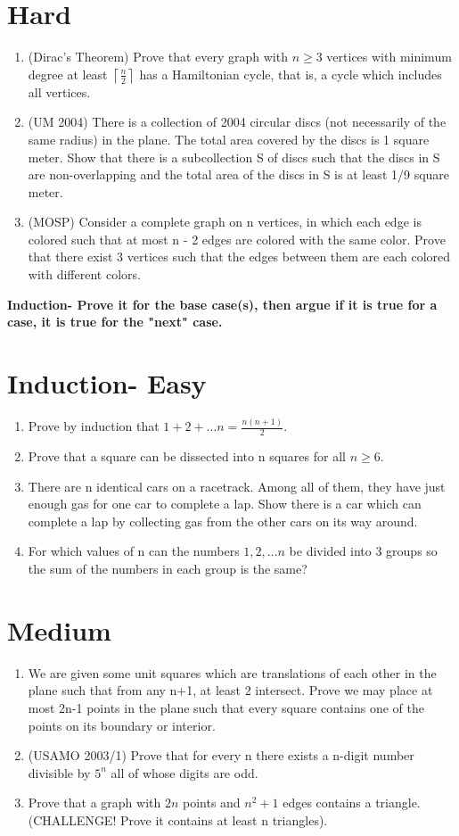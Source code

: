 \documentclass{article}
\begin{document}
\section{Hard}
\begin{enumerate}
\item (Dirac's Theorem) Prove that every graph with $n \geq 3$ vertices with minimum degree at least $\left\lceil \frac{n}{2}\right\rceil$ has a Hamiltonian cycle, that is, a cycle which includes all vertices.
\item (UM 2004) There is a collection of 2004 circular discs (not necessarily of the same
radius) in the plane. The total area covered by the discs is 1 square meter. Show that
there is a subcollection S of discs such that the discs in S are non-overlapping and the
total area of the discs in S is at least 1/9 square meter.
\item (MOSP) Consider a complete graph on n vertices, in which each edge is colored
such that at most n - 2 edges are colored with the same color. Prove
that there exist 3 vertices such that the edges between them are each
colored with different colors.
\end{enumerate}


\textbf{Induction- Prove it for the base case(s), then argue if it is true for a case, it is true for the "next" case.}
\section{Induction- Easy}
\begin{enumerate}
\item Prove by induction that $1+2+\ldots n = \frac{n(n+1)}{2}$.
\item Prove that a square can be dissected into n squares for all $n \geq 6$.
\item There are n identical cars on a racetrack. Among all of them, they have just enough gas for one car to complete a lap. Show there is a car which can complete a lap by collecting gas from the other cars on its way around.
\item For which values of n can the numbers $1,2,\ldots n$ be divided into 3 groups so the sum of the numbers in each group is the same?
\end{enumerate}
\section{Medium}
\begin{enumerate}
\item We are given some unit squares which are translations of each other in the plane such that from any n+1, at least 2 intersect. Prove we may place at most 2n-1 points in the plane such that every square contains one of the points on its boundary or interior.
\item (USAMO 2003/1) Prove that for every n there exists a n-digit number divisible by $5^n$ all of whose digits are odd.
\item Prove that a graph with $2n$ points and $n^2+1$ edges contains a triangle. (CHALLENGE! Prove it contains at least n triangles).
\end{enumerate}
\end{document}
